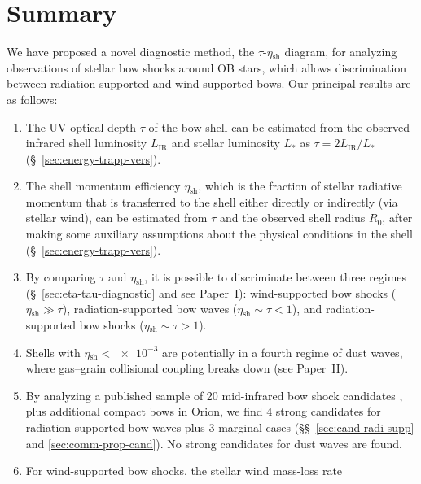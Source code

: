 \documentclass[useAMS, usenatbib, a4paper]{mnras}
\newcommand\IR{\ensuremath{_{\text{IR}}}}
\newcommand\shell{\ensuremath{_{\text{sh}}}}
\begin{document}


 


\section{Summary}
\label{sec:conclusions}

We have proposed a novel diagnostic method, the \(\tau\)-\(\eta\shell\)
diagram, for analyzing observations of stellar bow shocks around OB
stars, which allows discrimination between radiation-supported and
wind-supported bows.  Our principal results are as follows:
\begin{enumerate}[1.]
\item The UV optical depth \(\tau\) of the bow shell can be estimated
  from the observed infrared shell luminosity \(L\IR\) and stellar
  luminosity \(L_*\) as \(\tau = 2 L\IR/L_*\)
  (\S~\ref{sec:energy-trapp-vers}).
\item The shell momentum efficiency \(\eta\shell\), which is the
  fraction of stellar radiative momentum that is transferred to the
  shell either directly or indirectly (via stellar wind), can be
  estimated from \(\tau\) and the observed shell radius \(R_0\), after
  making some auxiliary assumptions about the physical conditions in
  the shell (\S~\ref{sec:energy-trapp-vers}).
\item By comparing \(\tau\) and \(\eta\shell\), it is possible to
  discriminate between three regimes (\S~\ref{sec:eta-tau-diagnostic}
  and see Paper~I): wind-supported bow shocks
  (\(\eta\shell \gg \tau\)), radiation-supported bow waves
  (\(\eta\shell \sim \tau < 1\)), and radiation-supported bow shocks
  (\(\eta\shell \sim \tau > 1\)).
\item Shells with \(\eta\shell < \num{e-3}\) are potentially in a
  fourth regime of dust waves, where gas--grain collisional coupling
  breaks down (see Paper~II).
\item By analyzing a published sample of 20 mid-infrared bow shock
  candidates \citep[K18]{Kobulnicky:2018a}, plus additional compact
  bows in Orion, we find 4 strong candidates for radiation-supported
  bow waves plus 3 marginal cases (\S\S~\ref{sec:cand-radi-supp} and
  \ref{sec:comm-prop-cand}).  No strong candidates for dust waves are
  found.
\item For wind-supported bow shocks, the stellar wind mass-loss rate

\end{enumerate}
\end{document}
